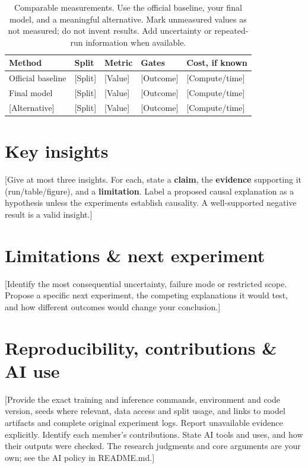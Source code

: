 \documentclass{article}
\begin{document}
\begin{table}[ht]
\caption{Comparable measurements. Use the official baseline, your final model,
and a meaningful alternative. Mark unmeasured values as not measured; do not
invent results. Add uncertainty or repeated-run information when available.}
\label{tab:comparison}
\centering
\begin{tabularx}{\textwidth}{@{}lXXXX@{}}
\toprule
Method & Split & Metric & Gates & Cost, if known \\
\midrule
Official baseline & [Split] & [Value] & [Outcome] & [Compute/time] \\
Final model & [Split] & [Value] & [Outcome] & [Compute/time] \\
{[Alternative]} & [Split] & [Value] & [Outcome] & [Compute/time] \\
\bottomrule
\end{tabularx}
\end{table}

\section{Key insights}
[Give at most three insights. For each, state a \textbf{claim}, the
\textbf{evidence} supporting it (run/table/figure), and a \textbf{limitation}.
Label a proposed causal explanation as a hypothesis unless the experiments
establish causality. A well-supported negative result is a valid insight.]

\section{Limitations \& next experiment}
[Identify the most consequential uncertainty, failure mode or restricted scope.
Propose a specific next experiment, the competing explanations it would test,
and how different outcomes would change your conclusion.]

\section{Reproducibility, contributions \& AI use}
[Provide the exact training and inference commands, environment and code version,
seeds where relevant, data access and split usage, and links to model artifacts
and complete original experiment logs. Report unavailable evidence explicitly.
Identify each member's contributions. State AI tools and uses, and how their
outputs were checked. The research judgments and core arguments are your own;
see the AI policy in README.md.]
\end{document}
